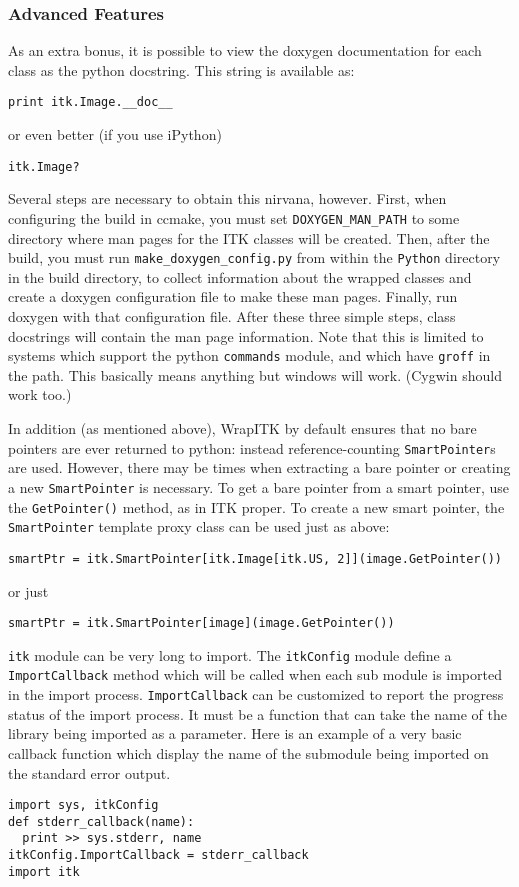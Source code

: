 \documentclass{InsightArticle}
\begin{document}
     \subsubsection{Advanced Features}

As an extra bonus, it is possible to view the doxygen documentation for each
class as the python docstring. This string is available as:
\small \begin{verbatim}
print itk.Image.__doc__
\end{verbatim} \normalsize
or even better (if you use iPython)
\small \begin{verbatim}
itk.Image?
\end{verbatim} \normalsize

Several steps are necessary to obtain this nirvana, however. First, when
configuring the build in ccmake, you must set \verb$DOXYGEN_MAN_PATH$ to some directory
where man pages for the ITK classes will be created. Then, after the build, you
must run \verb$make_doxygen_config.py$ from within the \verb$Python$ directory in the build
directory, to collect information about the wrapped classes and create a doxygen
configuration file to make these man pages. Finally, run doxygen with that
configuration file. After these three simple steps, class docstrings will
contain the man page information. Note that this is limited to systems which
support the python \verb$commands$ module, and which have \verb$groff$ in the path. This
basically means anything but windows will work. (Cygwin should work too.)

In addition (as mentioned above), WrapITK by default ensures that no bare
pointers are ever returned to python: instead reference-counting \verb$SmartPointer$s
are used. However, there may be times when extracting a bare pointer or creating
a new \verb$SmartPointer$ is necessary. To get a bare pointer from a smart pointer, use
the \verb$GetPointer()$ method, as in ITK proper. To create a new smart pointer, the
\verb$SmartPointer$ template proxy class can be used just as above:
\small \begin{verbatim}
smartPtr = itk.SmartPointer[itk.Image[itk.US, 2]](image.GetPointer())
\end{verbatim} \normalsize
or just
\small \begin{verbatim}
smartPtr = itk.SmartPointer[image](image.GetPointer())
\end{verbatim} \normalsize

\verb$itk$ module can be very long to import. The \verb$itkConfig$ module define
a \verb$ImportCallback$ method which will be called when each sub module is
imported in the import process. \verb$ImportCallback$ can be customized to report the
progress status of the import process. It must be a function that can take
the name of the library being imported as a parameter. Here is an example of a very
basic callback function which display the name of the submodule being imported on
the standard error output.
\small \begin{verbatim}
import sys, itkConfig
def stderr_callback(name):
  print >> sys.stderr, name
itkConfig.ImportCallback = stderr_callback
import itk
\end{verbatim} \normalsize
\end{document}
